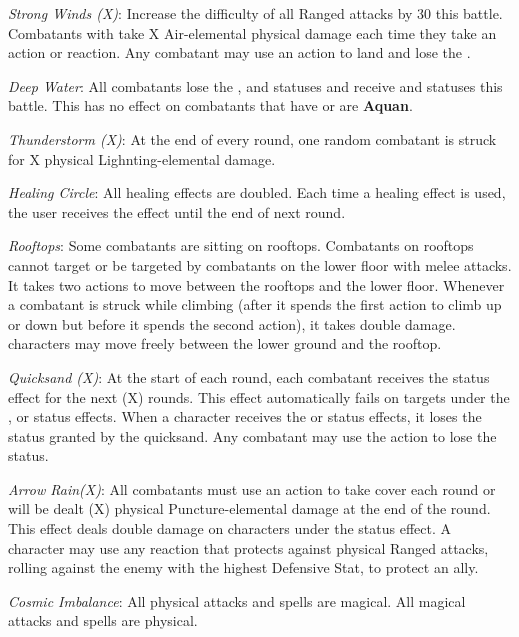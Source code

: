 \begin{multicols}{2}
\textit{Strong Winds (X)}: Increase the difficulty of all Ranged attacks by 30 this battle. Combatants with  take X Air-elemental physical damage each time they take an action or reaction. Any combatant may use an action to land and lose the . 

\textit{Deep Water}: All combatants lose the ,  and  statuses and receive  and  statuses this battle. This has no effect on combatants that have  or are \textbf{Aquan}. 

\textit{Thunderstorm (X)}: At the end of every round, one random combatant is struck for X physical Lighnting-elemental damage.

\textit{Healing Circle}: All healing effects are doubled. Each time a healing effect is used, the user receives the  effect until the end of next round.

\textit{Rooftops}: Some combatants are sitting on rooftops. Combatants on rooftops cannot target or be targeted by combatants on the lower floor with melee attacks. It takes two actions to move between the rooftops and the lower floor. Whenever a combatant is struck while climbing (after it spends the first action to climb up or down but before it spends the second action), it takes double damage.  characters may move freely between the lower ground and the rooftop.

\textit{Quicksand (X)}: At the start of each round, each combatant receives the  status effect for the next (X) rounds. This effect automatically fails on targets under the ,  or  status effects. When a character receives the  or  status effects, it loses the  status granted by the quicksand. Any combatant may use the  action to lose the  status.


\textit{Arrow Rain(X)}: All combatants must use an action to take cover each round or will be dealt (X) physical Puncture-elemental damage at the end of the round. This effect deals double damage on characters under the  status effect. A character may use any reaction that protects against physical Ranged attacks, rolling against the enemy with the highest Defensive Stat, to protect an ally.


\textit{Cosmic Imbalance}: All physical attacks and spells are magical. All magical attacks and spells are physical.

\end{multicols}

